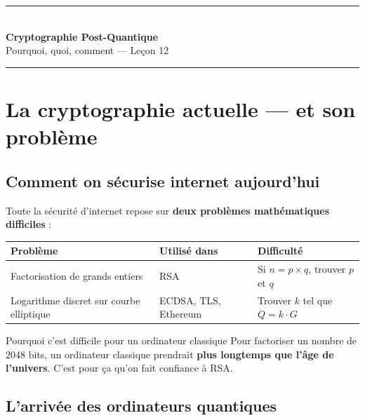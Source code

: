 \documentclass[12pt, a4paper]{article}
\begin{document}

\begin{center}
  {\color{suva_blue}\rule{\textwidth}{2pt}}\\[0.5cm]
  {\Huge\bfseries\color{suva_blue} Cryptographie Post-Quantique}\\[0.3cm]
  {\large\color{gray} Pourquoi, quoi, comment --- Leçon 12}\\[0.5cm]
  {\color{suva_blue}\rule{\textwidth}{0.5pt}}
\end{center}

\tableofcontents
\newpage

\section{La cryptographie actuelle — et son problème}

\subsection{Comment on sécurise internet aujourd'hui}

Toute la sécurité d'internet repose sur \textbf{deux problèmes mathématiques difficiles} :

\begin{center}
\renewcommand{\arraystretch}{1.5}
\begin{tabular}{lll}
  \toprule
  \textbf{Problème} & \textbf{Utilisé dans} & \textbf{Difficulté} \\
  \midrule
  Factorisation de grands entiers & RSA & Si $n = p \times q$, trouver $p$ et $q$ \\
  Logarithme discret sur courbe elliptique & ECDSA, TLS, Ethereum & Trouver $k$ tel que $Q = k \cdot G$ \\
  \bottomrule
\end{tabular}
\end{center}

\begin{exemple}{Pourquoi c'est difficile pour un ordinateur classique}
Pour factoriser un nombre de 2048 bits, un ordinateur classique prendrait
\textbf{plus longtemps que l'âge de l'univers}. C'est pour ça qu'on fait confiance à RSA.
\end{exemple}

\subsection{L'arrivée des ordinateurs quantiques}
\end{document}
